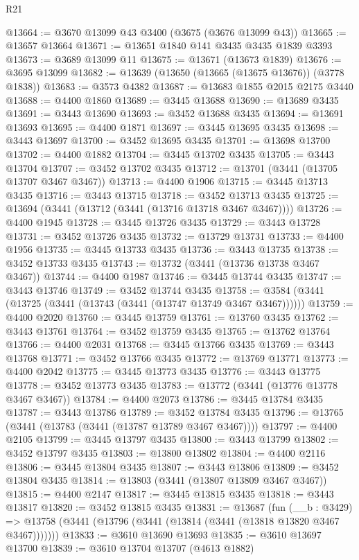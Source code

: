 \begin{lexlean}{R21}
\begin{coremodule}
@13664 := @3670 @13099 @43 @3400 (@3675 (@3676 @13099 @43))
@13665 := @13657 @13664
@13671 := @13651 @1840 @141 @3435 @3435 @1839 @3393
@13673 := @3689 @13099 @11
@13675 := @13671 (@13673 @1839)
@13676 := @3695 @13099
@13682 := @13639 (@13650 (@13665 (@13675 @13676)) (@3778 @1838))
@13683 := @3573 @4382
@13687 := @13683 @1855 @2015 @2175 @3440
@13688 := @4400 @1860
@13689 := @3445 @13688
@13690 := @13689 @3435
@13691 := @3443 @13690
@13693 := @3452 @13688 @3435
@13694 := @13691 @13693
@13695 := @4400 @1871
@13697 := @3445 @13695 @3435
@13698 := @3443 @13697
@13700 := @3452 @13695 @3435
@13701 := @13698 @13700
@13702 := @4400 @1882
@13704 := @3445 @13702 @3435
@13705 := @3443 @13704
@13707 := @3452 @13702 @3435
@13712 := @13701 (@3441 (@13705 @13707 @3467 @3467))
@13713 := @4400 @1906
@13715 := @3445 @13713 @3435
@13716 := @3443 @13715
@13718 := @3452 @13713 @3435
@13725 := @13694 (@3441 (@13712 (@3441 (@13716 @13718 @3467 @3467))))
@13726 := @4400 @1945
@13728 := @3445 @13726 @3435
@13729 := @3443 @13728
@13731 := @3452 @13726 @3435
@13732 := @13729 @13731
@13733 := @4400 @1956
@13735 := @3445 @13733 @3435
@13736 := @3443 @13735
@13738 := @3452 @13733 @3435
@13743 := @13732 (@3441 (@13736 @13738 @3467 @3467))
@13744 := @4400 @1987
@13746 := @3445 @13744 @3435
@13747 := @3443 @13746
@13749 := @3452 @13744 @3435
@13758 := @3584 (@3441 (@13725 (@3441 (@13743 (@3441 (@13747 @13749 @3467 @3467))))))
@13759 := @4400 @2020
@13760 := @3445 @13759
@13761 := @13760 @3435
@13762 := @3443 @13761
@13764 := @3452 @13759 @3435
@13765 := @13762 @13764
@13766 := @4400 @2031
@13768 := @3445 @13766 @3435
@13769 := @3443 @13768
@13771 := @3452 @13766 @3435
@13772 := @13769 @13771
@13773 := @4400 @2042
@13775 := @3445 @13773 @3435
@13776 := @3443 @13775
@13778 := @3452 @13773 @3435
@13783 := @13772 (@3441 (@13776 @13778 @3467 @3467))
@13784 := @4400 @2073
@13786 := @3445 @13784 @3435
@13787 := @3443 @13786
@13789 := @3452 @13784 @3435
@13796 := @13765 (@3441 (@13783 (@3441 (@13787 @13789 @3467 @3467))))
@13797 := @4400 @2105
@13799 := @3445 @13797 @3435
@13800 := @3443 @13799
@13802 := @3452 @13797 @3435
@13803 := @13800 @13802
@13804 := @4400 @2116
@13806 := @3445 @13804 @3435
@13807 := @3443 @13806
@13809 := @3452 @13804 @3435
@13814 := @13803 (@3441 (@13807 @13809 @3467 @3467))
@13815 := @4400 @2147
@13817 := @3445 @13815 @3435
@13818 := @3443 @13817
@13820 := @3452 @13815 @3435
@13831 := @13687
    (fun (__b : @3429) =>
    @13758 (@3441 (@13796 (@3441 (@13814 (@3441 (@13818 @13820 @3467 @3467)))))))
@13833 := @3610 @13690 @13693
@13835 := @3610 @13697 @13700
@13839 := @3610 @13704 @13707 (@4613 @1882)

\end{coremodule}
\end{lexlean}
